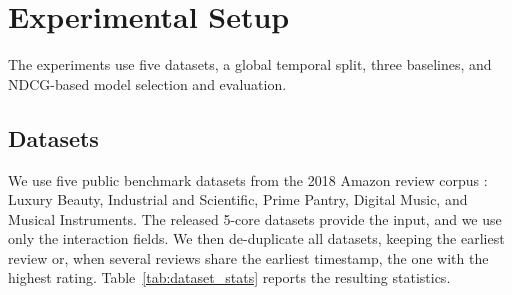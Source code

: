 \documentclass[pdflatex,sn-vancouver-num]{sn-jnl}%
\theoremstyle{thmstyleone}%
\theoremstyle{thmstyletwo}%
\theoremstyle{thmstylethree}%
\begin{document}



\section{Experimental Setup}\label{sec4}

The experiments use five datasets, a global temporal split, three baselines, and NDCG-based model selection and evaluation.

\subsection{Datasets}

We use five public benchmark datasets from the 2018 Amazon review corpus \cite{ni2019justifying}: Luxury Beauty, Industrial and Scientific, Prime Pantry, Digital Music, and Musical Instruments. The released 5-core datasets provide the input, and we use only the interaction fields. We then de-duplicate all datasets, keeping the earliest review or, when several reviews share the earliest timestamp, the one with the highest rating. Table~\ref{tab:dataset_stats} reports the resulting statistics.
\end{document}
